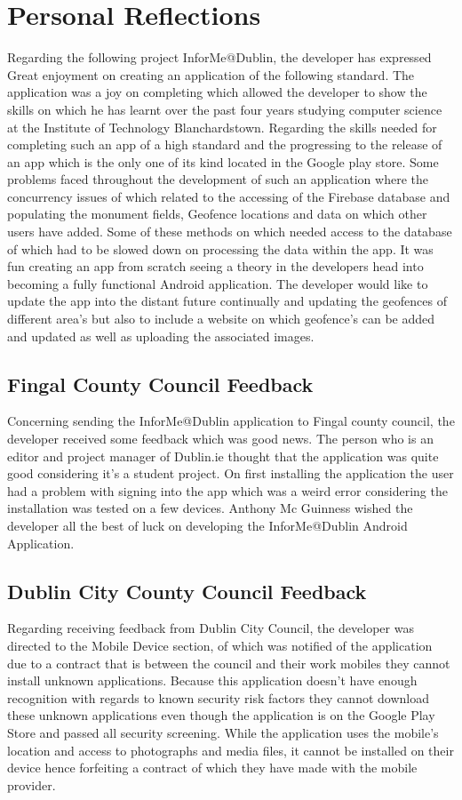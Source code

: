 \chapter{Personal Reflections}

Regarding the following project InforMe@Dublin, the developer has expressed Great enjoyment on creating an application of the following standard. The application was a joy on completing which allowed the developer to show the skills on which he has learnt over the past four years studying computer science at the Institute of Technology Blanchardstown. Regarding the skills needed for completing such an app of a high standard and the progressing to the release of an app which is the only one of its kind located in the Google play store. Some problems faced throughout the development of such an application where the concurrency issues of which related to the accessing of the Firebase database and populating the monument fields, Geofence locations and data on which other users have added. Some of these methods on which needed access to the database of which had to be slowed down on processing the data within the app. It was fun creating an app from scratch seeing a theory in the developers head into becoming a fully functional Android application. The developer would like to update the app into the distant future continually and updating the geofences of different area's but also to include a website on which geofence's can be added and updated as well as uploading the associated images.

\section{Fingal County Council Feedback}
Concerning sending the InforMe@Dublin application to Fingal county council, the developer received some feedback which was good news. The person who is an editor and project manager of Dublin.ie thought that the application was quite good considering it's a student project. On first installing the application the user had a problem with signing into the app which was a weird error considering the installation was tested on a few devices. Anthony Mc Guinness wished the developer all the best of luck on developing the InforMe@Dublin Android Application.

\section{Dublin City County Council Feedback}
Regarding receiving feedback from Dublin City Council, the developer was directed to the Mobile Device section, of which was notified of the application due to a contract that is between the council and their work mobiles they cannot install unknown applications. Because this application doesn't have enough recognition with regards to known security risk factors they cannot download these unknown applications even though the application is on the Google Play Store and passed all security screening. While the application uses the mobile's location and access to photographs and media files, it cannot be installed on their device hence forfeiting a contract of which they have made with the mobile provider. 
